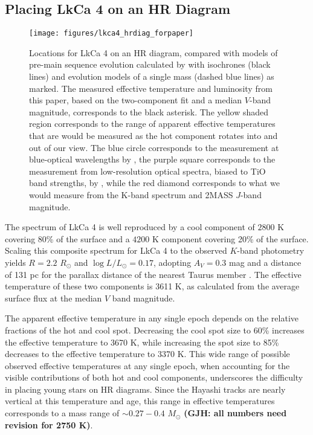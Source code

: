 \documentclass[twocolumn]{emulateapj}%
\begin{document}
\subsection{Placing LkCa 4 on an HR Diagram}

\begin{figure*}
 \centering
 \texttt{[image: figures/lkca4\_hrdiag\_forpaper]}
 \caption{Locations for LkCa 4 on an HR diagram, compared with models of pre-main sequence evolution calculated by \citet{baraffe15} with isochrones (black lines) and evolution models of a single mass (dashed blue lines) as marked.  The measured effective temperature and luminosity from this paper, based on the two-component fit and a median $V$-band magnitude, corresponds to the black asterisk.  The yellow shaded region corresponds to the range of apparent effective temperatures that are would be measured as the hot component rotates into and out of our view.  The blue circle corresponds to the measurement at blue-optical wavelengths by \citet{donati14}, the purple square corresponds to the measurement from low-resolution optical spectra, biased to TiO band strengths, by \citet[][biased to]{herczeg14}, while the red diamond corresponds to what we would measure from the K-band spectrum and 2MASS $J$-band magnitude.}
 \label{fig:hrdiag}
\end{figure*}

The spectrum of LkCa 4 is well reproduced by a cool component of $2800$ K covering 80\% of the surface and a $4200$ K component covering 20\% of the surface.   Scaling this composite spectrum for LkCa 4 to the observed $K$-band photometry yields $R=2.2$ $R_\odot$ and $\log L/L_\odot=0.17$, adopting $A_V=0.3$ mag and a distance of 131 pc for the parallax distance of the nearest Taurus member \citep{torres12}.  The effective temperature of these two components is 3611 K, as calculated from the average surface flux at the median $V$ band magnitude.  

The apparent effective temperature in any single epoch depends on the relative fractions of the hot and cool spot.  Decreasing the cool spot size to 60\% increases the effective temperature to 3670 K, while increasing the spot size to 85\% decreases to the effective temperature to 3370 K.  This wide range of possible observed effective temperatures at any single epoch, when accounting for the visible contributions of both hot and cool components, underscores the difficulty in placing young stars on HR diagrams.  Since the Hayashi tracks are nearly vertical at this temperature and age, this range in effective temperatures corresponds to a mass range of $\sim 0.27-0.4$ $M_\odot$  {\bf (GJH: all numbers need revision for 2750 K)}.
\end{document}
